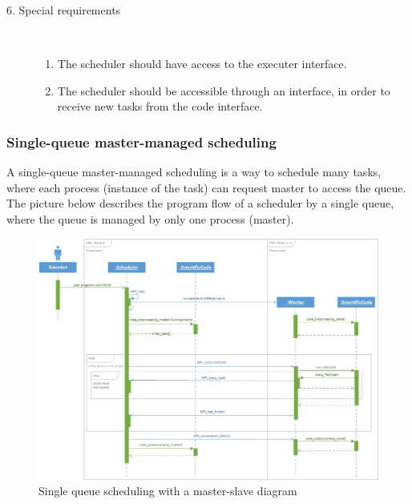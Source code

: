 \begin{description}
	\item [6. Special requirements]\hfill \\
	\vspace{-6.5mm}
	\begin{enumerate}
		\item The scheduler should have access to the executer interface.
		\item The scheduler should be accessible through an interface, in order to receive new tasks from the code interface.
	\end{enumerate}
	
\end{description}
\vspace{0.5cm}
\subsubsection{Single-queue master-managed scheduling}
\vspace{0.5cm}
A single-queue master-managed scheduling is a way to schedule many tasks, where each process (instance of the task) can request master to access the queue. The picture below describes the program flow of a scheduler by a single queue, where the queue is managed by only one process (master). 
\vspace{1cm}
	\begin{figure}[H]
	\centering
	\includegraphics[width=15cm]{images/Master-slave.jpg}
	\caption{Single queue scheduling with a master-slave diagram} 
	\end{figure}
\newpage
